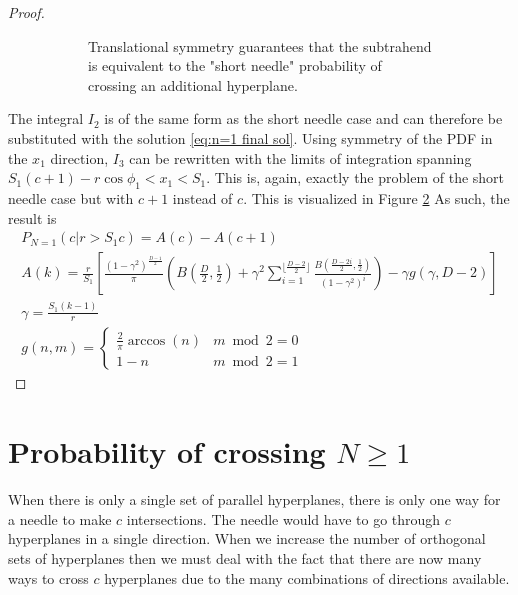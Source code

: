 \documentclass{article}
\begin{document}
\begin{proof}
\begin{figure}
\begin{subfigure}{0.45\textwidth}
			\caption{Translational symmetry guarantees that the subtrahend is equivalent to the "short needle"
			probability of crossing an additional hyperplane.}\label{fig:long r int}
		\end{subfigure}
		\caption{}
	\end{figure}

	The integral $I_2$ is of the same form as the short needle case and can therefore be substituted with the
	solution \ref{eq:n=1 final sol}. Using symmetry of the PDF in the $x_1$ direction, $I_3$ can be rewritten
	with the limits of integration spanning $S_1(c+1)-r\cos\phi_1 < x_1 < S_1$. This is, again, exactly the problem of
	the short needle case but with $c+1$ instead of $c$. This is visualized in Figure \ref{fig:long r int} As such, the result is
	\begin{gather}
		P_{N=1}(c | r>S_1c) = A(c) - A(c+1) \\
		A(k) = \frac{r}{S_1} \left[\frac{(1-\gamma^2)^{\frac{D-1}{2}}}{\pi} \left(B\left(\frac{D}{2}, \frac{1}{2} \right) + \gamma^2 \sum_{i=1}^{\lfloor \frac{D-2}{2} \rfloor}\frac{B(\frac{D-2i}{2}, \frac{1}{2})}{(1-\gamma^2)^i}\right) - \gamma g(\gamma, D-2) \right] \\
		\gamma = \frac{S_1(k-1)}{r} \\
		g(n, m) = \begin{cases}
			\frac{2}{\pi}\arccos(n) & m\bmod 2 = 0 \\
			1-n & m \bmod 2 = 1
		\end{cases}
	\end{gather}
\end{proof}


\section{Probability of crossing $N\ge 1$}
When there is only a single set of parallel hyperplanes, there is only one way for a needle to make
$c$ intersections. The needle would have to go through $c$ hyperplanes in a single direction.
When we increase the number of orthogonal sets of hyperplanes then we must deal with the fact that
there are now many ways to cross $c$ hyperplanes due to the many combinations of directions available.
\end{document}
